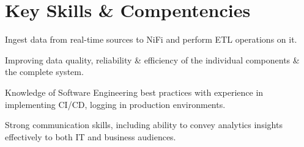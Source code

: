 \documentclass[]{deedy-resume-openfont}
\begin{document}
\begin{minipage}[t]{0.66\textwidth}
\section{Key Skills \& Compentencies} 
\vspace{\topsep} %
\begin{tightemize}
\item Ingest data from real-time sources to NiFi and perform ETL operations on it.
\item Improving data quality, reliability \& efficiency of the individual components \& the complete system.
\item Knowledge of Software Engineering best practices with experience in implementing CI/CD, logging in production environments.
\item Strong communication skills, including ability to convey analytics insights effectively to both IT and business audiences.

\end{tightemize}
\sectionsep


\end{minipage} 
\end{document}
